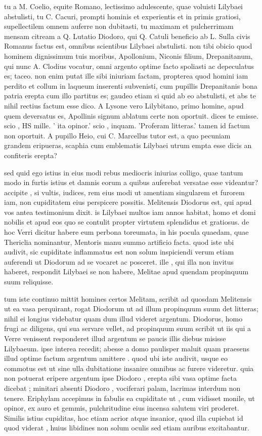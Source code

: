  tu a M. Coelio, equite Romano, lectissimo adulescente, quae voluisti Lilybaei abstulisti, tu C. Cacuri, prompti hominis et experientis et in primis gratiosi, supellectilem omnem auferre non dubitasti, tu maximam et pulcherrimam mensam citream a Q. Lutatio Diodoro, qui Q. Catuli beneficio ab L. Sulla civis Romanus factus est, omnibus scientibus Lilybaei abstulisti. non tibi obicio quod hominem dignissimum tuis moribus, Apollonium, Niconis filium, Drepanitanum, qui nunc A. Clodius vocatur, omni argento optime facto spoliasti ac depeculatus es; taceo. non enim putat ille sibi iniuriam factam, propterea quod homini iam perdito et collum in laqueum inserenti subvenisti, cum pupillis Drepanitanis bona patria erepta cum illo partitus es; gaudeo etiam si quid ab eo abstulisti, et abs te nihil rectius factum esse dico. A Lysone vero Lilybitano, primo homine, apud quem deversatus es, Apollinis signum ablatum certe non oportuit. dices te emisse. scio , HS mille. ' ita opinor.' scio , inquam. 'Proferam litteras.' tamen id factum non oportuit. A pupillo Heio, cui C. Marcellus tutor est, a quo pecuniam grandem eripueras, scaphia cum emblematis Lilybaei utrum empta esse dicis an confiteris erepta?

 sed quid ego istius in eius modi rebus mediocris iniurias colligo, quae tantum modo in furtis istius et damnis eorum a quibus auferebat versatae esse videantur? accipite , si vultis, iudices, rem eius modi ut amentiam singularem et furorem iam, non cupiditatem eius perspicere possitis. Melitensis Diodorus est, qui apud vos antea testimonium dixit. is Lilybaei multos iam annos habitat, homo et domi nobilis et apud eos quo se contulit propter virtutem splendidus et gratiosus. de hoc Verri dicitur habere eum perbona toreumata, in his pocula quaedam, quae Thericlia nominantur, Mentoris manu summo artificio facta. quod iste ubi audivit, sic cupiditate inflammatus est non solum inspiciendi verum etiam auferendi ut Diodorum ad se vocaret ac posceret. ille , qui illa non invitus haberet, respondit Lilybaei se non habere, Melitae apud quendam propinquum suum reliquisse.

 tum iste continuo mittit homines certos Melitam, scribit ad quosdam Melitensis ut ea vasa perquirant, rogat Diodorum ut ad illum propinquum suum det litteras; nihil ei longius videbatur quam dum illud videret argentum. Diodorus, homo frugi ac diligens, qui sua servare vellet, ad propinquum suum scribit ut iis qui a Verre venissent responderet illud argentum se paucis illis diebus misisse Lilybaeum. ipse interea recedit; abesse a domo paulisper maluit quam praesens illud optime factum argentum amittere . quod ubi iste audivit, usque eo commotus est ut sine ulla dubitatione insanire omnibus ac furere videretur. quia non potuerat eripere argentum ipse Diodoro , erepta sibi vasa optime facta dicebat ; minitari absenti Diodoro , vociferari palam, lacrimas interdum non tenere. Eriphylam accepimus in fabulis ea cupiditate ut , cum vidisset monile, ut opinor, ex auro et gemmis, pulchritudine eius incensa salutem viri proderet. Similis istius cupiditas, hoc etiam acrior atque insanior, quod illa cupiebat id quod viderat , huius libidines non solum oculis sed etiam auribus excitabantur.


